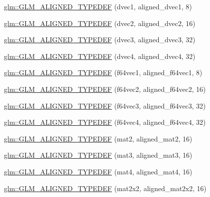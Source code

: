 \begin{DoxyCompactItemize}
\item 
\hyperlink{group__gtx__type__aligned_ga3e0f35fa0c626285a8bad41707e7316c}{glm\+::\+G\+L\+M\+\_\+\+A\+L\+I\+G\+N\+E\+D\+\_\+\+T\+Y\+P\+E\+D\+E\+F} (dvec1, aligned\+\_\+dvec1, 8)
\item 
\hyperlink{group__gtx__type__aligned_ga78bfec2f185d1d365ea0a9ef1e3d45b8}{glm\+::\+G\+L\+M\+\_\+\+A\+L\+I\+G\+N\+E\+D\+\_\+\+T\+Y\+P\+E\+D\+E\+F} (dvec2, aligned\+\_\+dvec2, 16)
\item 
\hyperlink{group__gtx__type__aligned_ga01fe6fee6db5df580b6724a7e681f069}{glm\+::\+G\+L\+M\+\_\+\+A\+L\+I\+G\+N\+E\+D\+\_\+\+T\+Y\+P\+E\+D\+E\+F} (dvec3, aligned\+\_\+dvec3, 32)
\item 
\hyperlink{group__gtx__type__aligned_ga687d5b8f551d5af32425c0b2fba15e99}{glm\+::\+G\+L\+M\+\_\+\+A\+L\+I\+G\+N\+E\+D\+\_\+\+T\+Y\+P\+E\+D\+E\+F} (dvec4, aligned\+\_\+dvec4, 32)
\item 
\hyperlink{group__gtx__type__aligned_ga8e842371d46842ff8f1813419ba49d0f}{glm\+::\+G\+L\+M\+\_\+\+A\+L\+I\+G\+N\+E\+D\+\_\+\+T\+Y\+P\+E\+D\+E\+F} (f64vec1, aligned\+\_\+f64vec1, 8)
\item 
\hyperlink{group__gtx__type__aligned_ga32814aa0f19316b43134fc25f2aad2b9}{glm\+::\+G\+L\+M\+\_\+\+A\+L\+I\+G\+N\+E\+D\+\_\+\+T\+Y\+P\+E\+D\+E\+F} (f64vec2, aligned\+\_\+f64vec2, 16)
\item 
\hyperlink{group__gtx__type__aligned_gaf3d3bbc1e93909b689123b085e177a14}{glm\+::\+G\+L\+M\+\_\+\+A\+L\+I\+G\+N\+E\+D\+\_\+\+T\+Y\+P\+E\+D\+E\+F} (f64vec3, aligned\+\_\+f64vec3, 32)
\item 
\hyperlink{group__gtx__type__aligned_ga804c654cead1139bd250f90f9bb01fad}{glm\+::\+G\+L\+M\+\_\+\+A\+L\+I\+G\+N\+E\+D\+\_\+\+T\+Y\+P\+E\+D\+E\+F} (f64vec4, aligned\+\_\+f64vec4, 32)
\item 
\hyperlink{group__gtx__type__aligned_gafed7d010235a3aa7ea2f88646858f2ae}{glm\+::\+G\+L\+M\+\_\+\+A\+L\+I\+G\+N\+E\+D\+\_\+\+T\+Y\+P\+E\+D\+E\+F} (mat2, aligned\+\_\+mat2, 16)
\item 
\hyperlink{group__gtx__type__aligned_ga17f911ee7b78ca6d1b91c4ab51ddb73c}{glm\+::\+G\+L\+M\+\_\+\+A\+L\+I\+G\+N\+E\+D\+\_\+\+T\+Y\+P\+E\+D\+E\+F} (mat3, aligned\+\_\+mat3, 16)
\item 
\hyperlink{group__gtx__type__aligned_ga31940e6012b72110e26fdb0f54805033}{glm\+::\+G\+L\+M\+\_\+\+A\+L\+I\+G\+N\+E\+D\+\_\+\+T\+Y\+P\+E\+D\+E\+F} (mat4, aligned\+\_\+mat4, 16)
\item 
\hyperlink{group__gtx__type__aligned_ga01de96cd0b541c52d2b4a3faf65822e9}{glm\+::\+G\+L\+M\+\_\+\+A\+L\+I\+G\+N\+E\+D\+\_\+\+T\+Y\+P\+E\+D\+E\+F} (mat2x2, aligned\+\_\+mat2x2, 16)

\end{DoxyCompactItemize}
